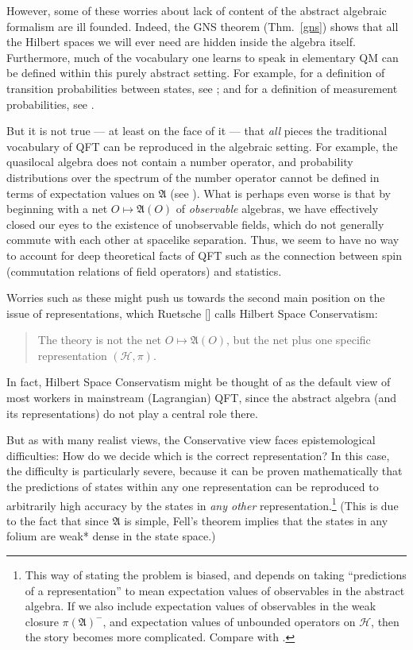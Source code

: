 \documentclass[12pt]{article}
\theoremstyle{definition}
\theoremstyle{definition}
\theoremstyle{remark}
\def\2#1{{\mathcal #1}}
\def\al#1{{\mathfrak #1}}
\begin{document}
However, some of these worries about lack of content of the abstract
algebraic formalism are ill founded.  Indeed, the GNS theorem (Thm.\
\ref{gns}) shows that all the Hilbert spaces we will ever need are
hidden inside the algebra itself.  Furthermore, much of the vocabulary
one learns to speak in elementary QM can be defined within this purely
abstract setting.  For example, for a definition of transition
probabilities between states, see \cite{robrop}; and for a definition
of measurement probabilities, see \cite{wald}.

But it is not true --- at least on the face of it --- that \emph{all}
pieces the traditional vocabulary of QFT can be reproduced in the
algebraic setting.  For example, the quasilocal algebra does not
contain a number operator, and probability distributions over the
spectrum of the number operator cannot be defined in terms of
expectation values on $\al A$ (see \cite{rindler}).  What is perhaps
even worse is that by beginning with a net $O\mapsto \al A(O)$ of
\emph{observable} algebras, we have effectively closed our eyes to the
existence of unobservable fields, which do not generally commute with
each other at spacelike separation.  Thus, we seem to have no way to
account for deep theoretical facts of QFT such as the connection
between spin (commutation relations of field operators) and
statistics.

Worries such as these might push us towards the second main position
on the issue of representations, which Ruetsche [\citeyear{ruetsche}]
calls Hilbert Space Conservatism:
\begin{quote}
  The theory is not the net $O\mapsto \al A (O)$, but the net plus one
  specific representation $(\2H ,\pi )$.
\end{quote}
In fact, Hilbert Space Conservatism might be thought of as the default
view of most workers in mainstream (Lagrangian) QFT, since the
abstract algebra (and its representations) do not play a central role
there.

But as with many realist views, the Conservative view faces
epistemological difficulties: How do we decide which is the correct
representation?  In this case, the difficulty is particularly severe,
because it can be proven mathematically that the predictions of states
within any one representation can be reproduced to arbitrarily high
accuracy by the states in \emph{any other}
representation.\footnote{This way of stating the problem is biased,
  and depends on taking ``predictions of a representation'' to mean
  expectation values of observables in the abstract algebra.  If we
  also include expectation values of observables in the weak closure
  $\pi (\al A)^{-}$, and expectation values of unbounded operators on
  $\2H$, then the story becomes more complicated.  Compare with
  \cite{clif}.}  (This is due to the fact that since $\al A$ is
simple, Fell's theorem implies that the states in any folium are weak*
dense in the state space.)
\end{document}

